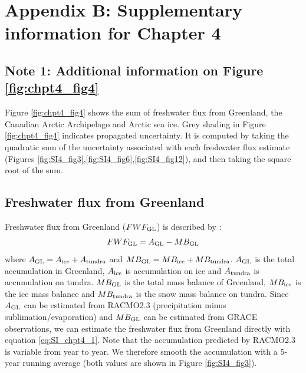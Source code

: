 \newpage
\section*{Appendix B: Supplementary information for Chapter 4}
\subsection*{Note 1: Additional information on Figure \ref{fig:chpt4_fig4}}
Figure \ref{fig:chpt4_fig4} shows the sum of freshwater flux from Greenland, the Canadian Arctic Archipelago and Arctic sea ice. Grey shading in Figure \ref{fig:chpt4_fig4} indicates propagated uncertainty.  It is computed by taking the quadratic sum of the uncertainty associated with each freshwater flux estimate (Figures \ref{fig:SI4_fig3},\ref{fig:SI4_fig6},\ref{fig:SI4_fig12}), and then taking the square root of the sum.

\subsection*{Freshwater flux from Greenland}
Freshwater flux from Greenland ($FWF_{\textup{GL}}$) is described by \citet{bamber2012recent}:
\begin{equation} \label{eq:SI_chpt4_1}
\begin{aligned}
FWF_{\textup{GL}}=A_{\textup{GL}}-MB_{\textup{GL}}
\end{aligned}
\end{equation}
where $A_{\textup{GL}}=A_{\textup{ice}}+A_{\textup{tundra}}$ and $MB_{\textup{GL}}=MB_{\textup{ice}}+MB_{\textup{tundra}}$.
$A_{\textup{GL}}$ is the total accumulation in Greenland, $A_{\textup{ice}}$ is accumulation on ice and $A_{\textup{tundra}}$ is accumulation on tundra. $MB_{\textup{GL}}$ is the total mass balance of Greenland, $MB_{\textup{ice}}$ is the ice mass balance and $MB_{\textup{tundra}}$ is the snow mass balance on tundra.  Since $A_{\textup{GL}}$ can be estimated from RACMO2.3 (precipitation minus sublimation/evaporation) and $MB_{\textup{GL}}$ can be estimated from GRACE observations, we can estimate the freshwater flux from Greenland directly with equation \ref{eq:SI_chpt4_1}.  Note that the accumulation predicted by RACMO2.3 is variable from year to year.  We therefore smooth the accumulation with a 5-year running average (both values are shown in Figure \ref{fig:SI4_fig3}). 

